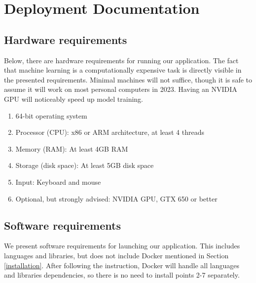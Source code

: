 \documentclass{article}
\begin{document}
\newpage


\tableofcontents
\newpage

\section{Deployment Documentation}
\subsection{Hardware requirements}

Below, there are hardware requirements for running our application. The fact that machine learning is a computationally expensive task is directly visible in the presented requirements. Minimal machines will not suffice, though it is safe to assume it will work on most personal computers in 2023. Having an NVIDIA GPU will noticeably speed up model training.

\begin{enumerate}
    \item 64-bit operating system
    \item Processor (CPU): x86 or ARM architecture, at least 4 threads
    \item Memory (RAM): At least 4GB RAM
    \item Storage (disk space): At least 5GB disk space
    \item Input: Keyboard and mouse
    \item Optional, but strongly advised: NVIDIA GPU, GTX 650 or better
\end{enumerate}


\subsection{Software requirements} \label{software-deps} %
We present software requirements for launching our application. This includes languages and libraries, but does not include Docker mentioned in Section \ref{installation}. After following the instruction, Docker will handle all languages and libraries dependencies, so there is no need to install points 2-7 separately.
\end{document}
